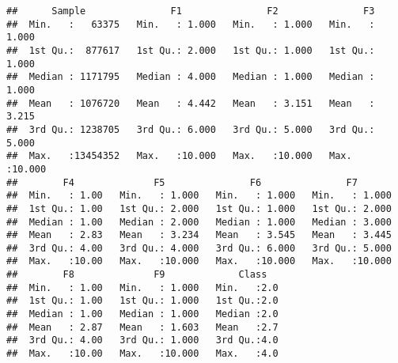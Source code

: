 \documentclass[
]{article}
\newenvironment{Shaded}{\begin{snugshade}}{\end{snugshade}}
\newcommand{\AttributeTok}[1]{\textcolor[rgb]{0.77,0.63,0.00}{#1}}
\newcommand{\DecValTok}[1]{\textcolor[rgb]{0.00,0.00,0.81}{#1}}
\newcommand{\FunctionTok}[1]{\textcolor[rgb]{0.00,0.00,0.00}{#1}}
\newcommand{\NormalTok}[1]{#1}
\newcommand{\OtherTok}[1]{\textcolor[rgb]{0.56,0.35,0.01}{#1}}
\newcommand{\SpecialCharTok}[1]{\textcolor[rgb]{0.00,0.00,0.00}{#1}}
\newcommand{\StringTok}[1]{\textcolor[rgb]{0.31,0.60,0.02}{#1}}
\begin{document}
\begin{verbatim}
##      Sample               F1               F2               F3        
##  Min.   :   63375   Min.   : 1.000   Min.   : 1.000   Min.   : 1.000  
##  1st Qu.:  877617   1st Qu.: 2.000   1st Qu.: 1.000   1st Qu.: 1.000  
##  Median : 1171795   Median : 4.000   Median : 1.000   Median : 1.000  
##  Mean   : 1076720   Mean   : 4.442   Mean   : 3.151   Mean   : 3.215  
##  3rd Qu.: 1238705   3rd Qu.: 6.000   3rd Qu.: 5.000   3rd Qu.: 5.000  
##  Max.   :13454352   Max.   :10.000   Max.   :10.000   Max.   :10.000  
##        F4              F5               F6               F7        
##  Min.   : 1.00   Min.   : 1.000   Min.   : 1.000   Min.   : 1.000  
##  1st Qu.: 1.00   1st Qu.: 2.000   1st Qu.: 1.000   1st Qu.: 2.000  
##  Median : 1.00   Median : 2.000   Median : 1.000   Median : 3.000  
##  Mean   : 2.83   Mean   : 3.234   Mean   : 3.545   Mean   : 3.445  
##  3rd Qu.: 4.00   3rd Qu.: 4.000   3rd Qu.: 6.000   3rd Qu.: 5.000  
##  Max.   :10.00   Max.   :10.000   Max.   :10.000   Max.   :10.000  
##        F8              F9             Class    
##  Min.   : 1.00   Min.   : 1.000   Min.   :2.0  
##  1st Qu.: 1.00   1st Qu.: 1.000   1st Qu.:2.0  
##  Median : 1.00   Median : 1.000   Median :2.0  
##  Mean   : 2.87   Mean   : 1.603   Mean   :2.7  
##  3rd Qu.: 4.00   3rd Qu.: 1.000   3rd Qu.:4.0  
##  Max.   :10.00   Max.   :10.000   Max.   :4.0
\end{verbatim}

\begin{Shaded}
\end{Shaded}
\end{document}
